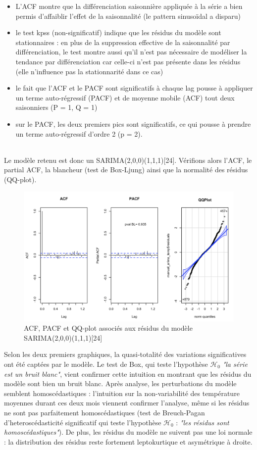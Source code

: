 \documentclass{article}
\theoremstyle{definition}
\theoremstyle{remark}
\begin{document}
\begin{minipage}{.5\textwidth}
    \begin{itemize}
        \item L'ACF montre que la différenciation saisonnière appliquée à la série a bien permis d'affaiblir l'effet de la saisonnalité (le pattern sinusoïdal a disparu)
        \item le test kpss (non-significatif) indique que les résidus du modèle sont stationnaires : en plus de la suppression effective de la saisonnalité par différenciation, le test montre aussi qu'il n'est pas nécessaire de modéliser la tendance par différenciation car celle-ci n'est pas présente dans les résidus (elle n'influence pas la stationnarité dans ce cas)
        \item le fait que l'ACF et le PACF sont significatifs à chaque lag pousse à appliquer un terme auto-régressif (PACF) et de moyenne mobile (ACF) tout deux saisonniers (P = 1, Q = 1)
        \item sur le PACF, les deux premiers pics sont significatifs, ce qui pousse à prendre un terme auto-régressif d'ordre 2 (p = 2).
    \end{itemize}
\end{minipage}
\newline
\\
Le modèle retenu est donc un SARIMA(2,0,0)(1,1,1)[24].\newline
Vérifions alors l'ACF, le partial ACF, la blancheur (test de Box-Ljung) ainsi que la normalité des résidus (QQ-plot).
\FloatBarrier
\begin{figure}[!h]
    \centering
    \includegraphics[width=0.6\linewidth]{fig5.png}
    \caption{ACF, PACF et QQ-plot associés aux résidus du modèle SARIMA(2,0,0)(1,1,1)[24]}
    \label{fig:enter-label}
\end{figure}
Selon les deux premiers graphiques, la quasi-totalité des variations significatives ont été captées par le modèle. Le test de Box, qui teste l'hypothèse $\mathcal{H}_0$ \textit{"la série est un bruit blanc"}, vient confirmer cette intuition en montrant que les résidus du modèle sont bien un bruit blanc.\newline
Après analyse, les perturbations du modèle semblent homoscédastiques : l'intuition sur la non-variabilité des température moyennes durant ces deux mois viennent confirmer l'analyse, même si les résidus ne sont pas parfaitement homoscédastiques (test de Breuch-Pagan d'heteroscédasticité significatif qui teste l'hypothèse $\mathcal{H}_0$ : \textit{"les résidus sont homoscédastiques"}). De plus, les résidus du modèle ne suivent pas une loi normale : la distribution des résidus reste fortement leptokurtique et asymétrique à droite. 
\end{document}
